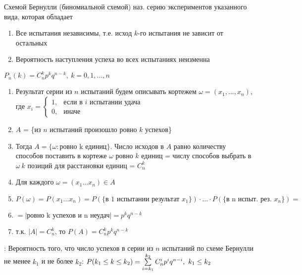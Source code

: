
\OPR Схемой Бернулли (биномиальной схемой) наз. серию экспериментов указанного вида, которая обладает

\begin{enumerate}[topsep=0pt, leftmargin=20pt, noitemsep]
	\item Все испытания независимы, т.е. исход $k$-го испытания не зависит от остальных
	\item Вероятность наступления успеха во всех испытаниях неизменна
\end{enumerate}

\THRM $P_n(k)=C_n^kp^kq^{n-k},~k=0,1,...,n$


\begin{enumerate}[topsep=0pt, leftmargin=20pt, noitemsep]
	\item Результат серии из $n$ испытаний будем описывать кортежем $\omega = (x_1,...,x_n)$, где $x_i =
	\begin{cases}
		1,  & \text{если в } i \text{ испытании удача}\\
		0,  & \text{иначе}
	\end{cases}$

	\item $A$ = \{из $n$ испытаний произошло ровно $k$ успехов\}
	\item [] Тогда $A=\{\omega : \text{ровно k единиц}\}$. Число исходов в $A$ равно количеству способов поставить в кортеже $\omega$ ровно $k$ единиц = числу способов выбрать в $\omega~k$ позиций для расстановки единиц = $C_n^k$
	
	\item Для каждого $\omega = (x_1...x_n)\in A$
	\item [] $P(\omega)=P(x_1...x_n)=P(\{\text{в 1 испытании результат }x_1\})\cdot...\cdot P(\{\text{в n испыт. рез. }x_n\}) = $
	\item [] $= |\text{ровно k успехов и n неудач}| = p^kq^{n-k}$
	
	\item т.к. $|A|=C_n^k$, то $P(A)=C_n^kp^kq^{n-k}$ 
\end{enumerate}

: Вероятность того, что число успехов в серии из $n$ испытаний по схеме Бернулли не менее $k_1$ и не более $k_2$: $P(k_1\leq k\leq k_2)=\sum\limits_{i=k_1}^{k_2}C_n^ip^iq^{n-i},~k_1\leq k_2$

